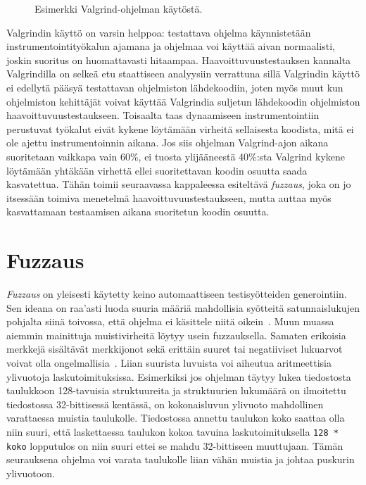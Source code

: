 \begin{figure}[H]



\caption{Esimerkki Valgrind-ohjelman käytöstä.}
\label{ValgrindEsimerkki}
\end{figure}

Valgrindin käyttö on varsin helppoa:
testattava ohjelma käynnistetään instrumentointityökalun ajamana ja ohjelmaa voi käyttää aivan normaalisti,
joskin suoritus on huomattavasti hitaampaa.
Haavoittuvuustestauksen kannalta Valgrindilla on selkeä etu staattiseen analyysiin verrattuna sillä
Valgrindin käyttö ei edellytä pääsyä testattavan ohjelmiston lähdekoodiin,
joten myös muut kun ohjelmiston kehittäjät voivat käyttää Valgrindia suljetun lähdekoodin ohjelmiston haavoittuvuustestaukseen.
Toisaalta taas dynaamiseen instrumentointiin perustuvat työkalut eivät kykene löytämään virheitä
sellaisesta koodista, mitä ei ole ajettu instrumentoinnin aikana.
Jos siis ohjelman Valgrind-ajon aikana suoritetaan vaikkapa vain 60\%,
ei tuosta ylijääneestä 40\%:sta Valgrind kykene löytämään yhtäkään virhettä
ellei suoritettavan koodin osuutta saada kasvatettua.
Tähän toimii seuraavassa kappaleessa esiteltävä \emph{fuzzaus},
joka on jo itsessään toimiva menetelmä haavoittuvuustestaukseen,
mutta auttaa myös kasvattamaan testaamisen aikana suoritetun koodin osuutta.

\section{Fuzzaus}
\label{Fuzzaus}

\emph{Fuzzaus} on yleisesti käytetty keino automaattiseen testisyötteiden generointiin.
Sen ideana on raa'asti luoda suuria määriä mahdollisia syötteitä satunnaislukujen pohjalta siinä toivossa,
että ohjelma ei käsittele niitä oikein~\cite{UnixReliability}.
Muun muassa aiemmin mainittuja muistivirheitä löytyy usein fuzzauksella.
Samaten erikoisia merkkejä sisältävät merkkijonot sekä erittäin suuret tai negatiiviset lukuarvot
voivat olla ongelmallisia~\cite{ViolatingAssumptions}.
Liian suurista luvuista voi aiheutua aritmeettisia ylivuotoja laskutoimituksissa.
Esimerkiksi jos ohjelman täytyy lukea tiedostosta taulukkoon 128-tavuisia struktuureita
ja struktuurien lukumäärä on ilmoitettu tiedostossa 32-bittisessä kentässä,
on kokonaisluvun ylivuoto mahdollinen varattaessa muistia taulukolle.
Tiedostossa annettu taulukon koko saattaa olla niin suuri,
että laskettaessa taulukon kokoa tavuina laskutoimituksella \texttt{128 * koko}
lopputulos on niin suuri ettei se mahdu 32-bittiseen muuttujaan.
Tämän seurauksena ohjelma voi varata taulukolle liian vähän muistia
ja johtaa puskurin ylivuotoon.

